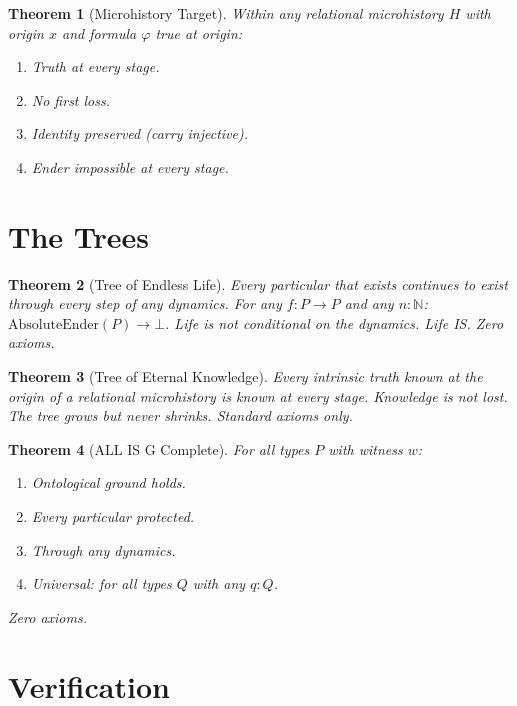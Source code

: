 \documentclass[12pt,a4paper]{article}
\newtheorem{theorem}{Theorem}[section]
\begin{document}
\begin{theorem}[Microhistory Target]\label{thm:micro-target}
Within any relational microhistory $H$ with origin $x$ and formula
$\varphi$ true at origin:
\begin{enumerate}
    \item Truth at every stage.
    \item No first loss.
    \item Identity preserved (carry injective).
    \item Ender impossible at every stage.
\end{enumerate}
\end{theorem}

\section{The Trees}

\begin{theorem}[Tree of Endless Life]\label{thm:life}
Every particular that exists continues to exist through every step of
any dynamics. For any $f : P \to P$ and any $n : \mathbb{N}$:
$\text{AbsoluteEnder}(P) \to \bot$.
Life is not conditional on the dynamics. Life IS. Zero axioms.
\end{theorem}

\begin{theorem}[Tree of Eternal Knowledge]\label{thm:knowledge}
Every intrinsic truth known at the origin of a relational microhistory
is known at every stage. Knowledge is not lost. The tree grows but never
shrinks. Standard axioms only.
\end{theorem}

\begin{theorem}[ALL IS G Complete]\label{thm:complete}
For all types $P$ with witness $w$:
\begin{enumerate}
    \item Ontological ground holds.
    \item Every particular protected.
    \item Through any dynamics.
    \item Universal: for all types $Q$ with any $q : Q$.
\end{enumerate}
Zero axioms.
\end{theorem}

\section{Verification}
\end{document}
